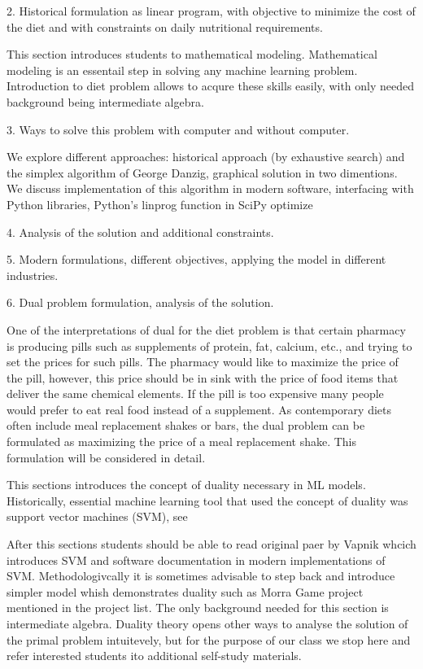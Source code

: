2. Historical formulation as linear program, with objective to minimize the cost of the diet and with constraints on daily nutritional requirements.

This section introduces students to mathematical modeling. Mathematical modeling is an essentail step in solving any machine learning problem. Introduction to diet problem allows to acqure these  skills easily, with only needed background being intermediate algebra.


3. Ways to solve this problem with computer and without computer.

We explore different approaches: historical approach (by exhaustive search) and the simplex algorithm of George Danzig, graphical solution in two dimentions. We discuss implementation of this algorithm in modern software, interfacing with Python libraries, Python's linprog function in SciPy optimize

4. Analysis of the solution and additional constraints.

5. Modern formulations, different objectives, applying the model in different industries.

6. Dual problem formulation, analysis of the solution.

One of the interpretations of dual for the diet problem is that certain pharmacy is producing pills such as supplements of protein, fat, calcium, etc., and trying to set the prices for such pills. The pharmacy would like to maximize the price of the pill, however, this price should be in sink with the price of food items that deliver the same chemical elements. If the pill is too expensive many people would prefer to eat real food instead of a supplement. As contemporary diets often include meal replacement shakes or bars, the dual problem can be formulated as maximizing the price of a meal replacement shake. This formulation will be considered in detail. 

This sections introduces the concept of duality necessary in ML models. Historically, essential machine learning tool that used the concept of duality was support vector machines (SVM), see \cite{VC}

After this sections students should be able to read original paer by Vapnik whcich introduces SVM and software documentation in modern implementations of SVM. Methodologivcally it is sometimes advisable to step back and introduce simpler model whish demonstrates duality such as Morra Game project mentioned in the project list. The only background needed for this section is intermediate algebra. Duality theory opens other ways to analyse the solution of the primal problem intuitevely, but for the purpose of our class we stop here and refer interested students ito additional self-study materials.

